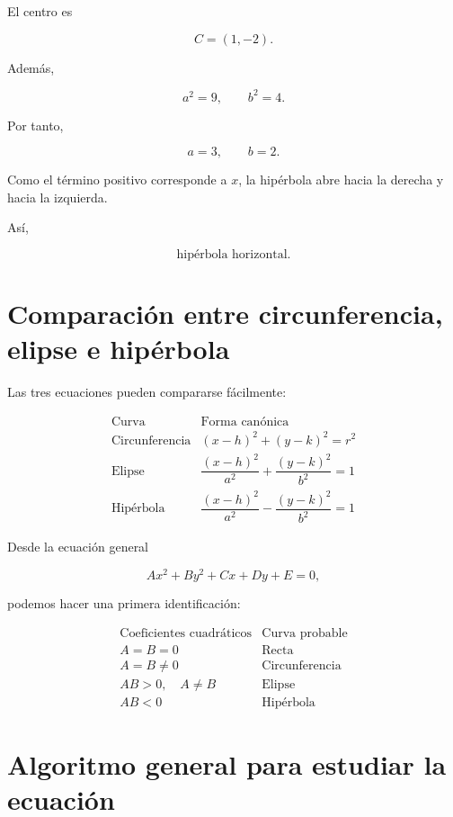 \documentclass[12pt]{article}
\theoremstyle{plain}
\theoremstyle{definition}
\theoremstyle{remark}
\begin{document}
{El centro es

\[
\boxed{
C=(1,-2).
}
\]

Además,

\[
a^2=9,
\qquad
b^2=4.
\]

Por tanto,

\[
a=3,
\qquad
b=2.
\]

Como el término positivo corresponde a \(x\), la hipérbola abre hacia la
derecha y hacia la izquierda.

Así,

\[
\boxed{
\text{hipérbola horizontal}.
}
\]

\section*{Comparación entre circunferencia, elipse e hipérbola}

Las tres ecuaciones pueden compararse fácilmente:

\[
\boxed{
\begin{array}{c|c}
\text{Curva} & \text{Forma canónica}\\
\hline
\text{Circunferencia}
&
(x-h)^2+(y-k)^2=r^2
\\[2mm]
\text{Elipse}
&
\dfrac{(x-h)^2}{a^2}
+
\dfrac{(y-k)^2}{b^2}
=1
\\[4mm]
\text{Hipérbola}
&
\dfrac{(x-h)^2}{a^2}
-
\dfrac{(y-k)^2}{b^2}
=1
\end{array}
}
\]

Desde la ecuación general

\[
Ax^2+By^2+Cx+Dy+E=0,
\]

podemos hacer una primera identificación:

\[
\boxed{
\begin{array}{c|c}
\text{Coeficientes cuadráticos} & \text{Curva probable}\\
\hline
A=B=0 & \text{Recta}\\
A=B\neq0 & \text{Circunferencia}\\
AB>0,\quad A\neq B & \text{Elipse}\\
AB<0 & \text{Hipérbola}
\end{array}
}
\]

\section*{Algoritmo general para estudiar la ecuación}

}
\end{document}
